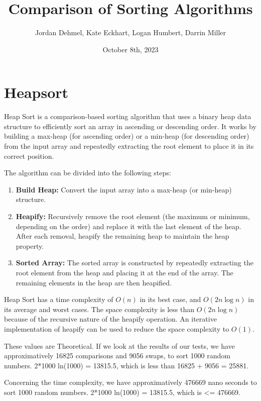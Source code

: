 \documentclass[12pt]{amsart}
\title{Comparison of Sorting Algorithms}
\author{Jordan Dehmel, Kate Eckhart, Logan Humbert, Darrin Miller}
\date{October 8th, 2023}
\begin{document}
\maketitle

\section{Heapsort}
Heap Sort is a comparison-based sorting algorithm that uses a binary heap data structure to efficiently sort an array in ascending or descending order. It works by building a max-heap (for ascending order) or a min-heap (for descending order) from the input array and repeatedly extracting the root element to place it in its correct position.
\newline

The algorithm can be divided into the following steps:

\begin{enumerate}
    \item \textbf{Build Heap:} Convert the input array into a max-heap (or min-heap) structure.
    \item \textbf{Heapify:} Recursively remove the root element (the maximum or minimum, depending on the order) and replace it with the last element of the heap. After each removal, heapify the remaining heap to maintain the heap property.
    \item \textbf{Sorted Array:} The sorted array is constructed by repeatedly extracting the root element from the heap and placing it at the end of the array. The remaining elements in the heap are then heapified.
\end{enumerate}

Heap Sort has a time complexity of $O(n)$ in its best case, and $O(2 n \log n)$ in its average and worst cases. \newline
The space complexity is less than $O(2 n \log n)$ because of the recursive nature of the heapify operation.
An iterative implementation of heapify can be used to reduce the space complexity to $O(1)$.
\newline

These values are Theoretical. If we look at the results of our tests, we have approximatively 16825 comparisons and 9056 swaps, to sort 1000 random numbers.
2*1000 ln(1000) = 13815.5, which is less than 16825 + 9056 = 25881.

Concerning the time complexity, we have approximatively 476669 nano seconds to sort 1000 random numbers. 2*1000 ln(1000) = 13815.5, which is <= 476669.
\end{document}
